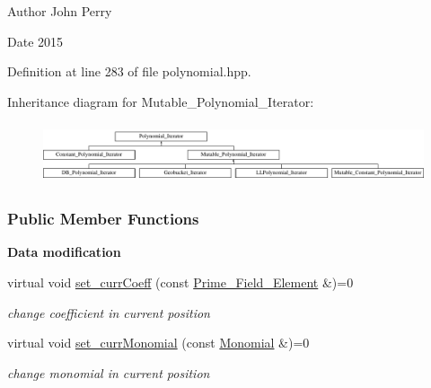 \begin{DoxyAuthor}{Author}
John Perry 
\end{DoxyAuthor}
\begin{DoxyDate}{Date}
2015 
\end{DoxyDate}


Definition at line 283 of file polynomial.\+hpp.

Inheritance diagram for Mutable\+\_\+\+Polynomial\+\_\+\+Iterator\+:\begin{figure}[H]
\begin{center}
\leavevmode
\includegraphics[height=1.779661cm]{group___iterator_group}
\end{center}
\end{figure}
\subsubsection*{Public Member Functions}
\begin{Indent}\textbf{ Data modification}\par
\begin{DoxyCompactItemize}
\item 
\mbox{\label{group___iterator_group_a68d273d038b81b687559cf3e7f2c6df3}} 
virtual void \hyperlink{group___iterator_group_a68d273d038b81b687559cf3e7f2c6df3}{set\+\_\+curr\+Coeff} (const \hyperlink{group___fields_group_class_prime___field___element}{Prime\+\_\+\+Field\+\_\+\+Element} \&)=0
\begin{DoxyCompactList}\small\item\em change coefficient in current position \end{DoxyCompactList}\item 
\mbox{\label{group___iterator_group_aeb3668fd81e4284a84c8be4cd2416009}} 
virtual void \hyperlink{group___iterator_group_aeb3668fd81e4284a84c8be4cd2416009}{set\+\_\+curr\+Monomial} (const \hyperlink{group__polygroup_class_monomial}{Monomial} \&)=0
\begin{DoxyCompactList}\small\item\em change monomial in current position \end{DoxyCompactList}\end{DoxyCompactItemize}
\end{Indent}
